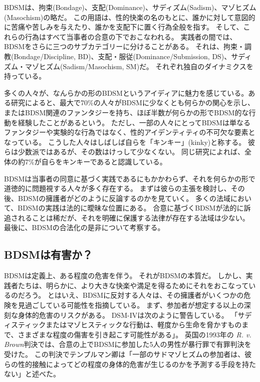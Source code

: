 \documentclass[paper=a4,book,openany]{jlreq}
\begin{document}
BDSMは、拘束(Bondage)、支配(Dominance)、サディズム(Sadism)、マゾヒズム(Masochism)の略だ。
この用語は、性的快楽の名のもとに、誰かに対して意図的に苦痛や苦しみを与えたり、誰かを支配下に置く行為全般を指す。
そして、これらの行為はすべて当事者の合意の下でおこなわれる。
実践者の間では、BDSMをさらに三つのサブカテゴリーに分けることがある。
それは、拘束・調教(Bondage/Discipline, BD)、支配・服従(Dominance/Submission, DS)、サディズム・マゾヒズム(Sadism/Masochism, SM)だ。
それぞれ独自のダイナミクスを持っている。

多くの人々が、なんらかの形のBDSMというアイディアに魅力を感じている。ある研究によると、最大で70\%の人々がBDSMに少なくとも何らかの関心を示し、またはBDSM関連のファンタジーを持ち、ほぼ半数が何らかの形でBDSM的な行動を経験したことがあるという\citep{holvoet17:_fifty_shades_belgian_gray}。
ただし、一部の人々にとってBDSMは単なるファンタジーや実験的な行為ではなく、性的アイデンティティの不可欠な要素となっている。
こうした人々はしばしば自らを「キンキー」(kinky)と称する。
彼らは少数派ではあるが、その数はけっして少なくない。
同じ研究によれば、全体の約7\%が自らをキンキーであると認識している。

BDSMは当事者の同意に基づく実践であるにもかかわらず、それを何らかの形で道徳的に問題視する人々が多く存在する。
まずは彼らの主張を検討し、その後、BDSMの擁護者がどのように反論するのかを見ていく。
多くの法域において、BDSMの実践は法的に曖昧な位置にある。
合意に基づくBDSMが法的に訴追されることは稀だが、それを明確に保護する法律が存在する法域は少ない。
最後に、BDSMの合法化の是非について考察する。

\subsection{BDSMは有害か？}

BDSMは定義上、ある程度の危害を伴う。
それがBDSMの本質だ。
しかし、実践者たちは、明らかに、より大きな快楽や満足を得るためにそれをおこなっているのだろう。
とはいえ、BDSMに反対する人々は、その擁護者がいくつかの危険を見過ごしている可能性を指摘している。
まず、参加者が想定する以上の深刻な身体的危害のリスクがある。
DSM-IVは次のように警告している。
「サディスティックまたはマゾヒスティックな行動は、軽度から生命を脅かすものまで、さまざまな程度の傷害を引き起こす可能性がある」\citep[p.567]{DSM4}。
英国の1993年の \emph{R. v. Brown}判決では、合意の上でBDSMに参加した5人の男性が暴行罪で有罪判決を受けた。
この判決でテンプルマン卿は「一部のサドマゾヒズムの参加者は、彼らの性的接触によってどの程度の身体的危害が生じるのかを予測する手段を持たない」と述べた。
\end{document}
